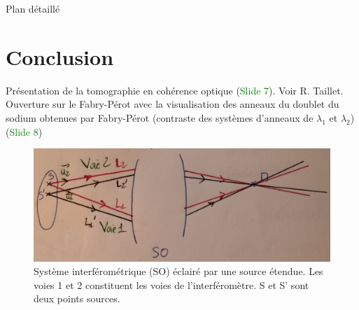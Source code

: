 \begin{reportBlock}{Plan détaillé}
  \section*{Conclusion}
  Présentation de la tomographie en cohérence optique (\textcolor{green}{Slide 7}). Voir R. Taillet.\\
  Ouverture sur le Fabry-Pérot avec la visualisation des anneaux du doublet du sodium obtenues par Fabry-Pérot (contraste des systèmes d'anneaux de $\lambda_1$ et $\lambda_2$) (\textcolor{green}{Slide 8})
\end{reportBlock}

\clearpage
  \begin{figure}[!htbp]
  \centering
  \includegraphics[scale=0.6]{LP_DivisionAmplitude/localisation.jpg}
  \caption{\label{fig:localisation}Système interférométrique (SO) éclairé par une source étendue. Les voies 1 et 2 constituent les voies de l'interféromètre. S et S' sont deux points sources.}
  \end{figure}
  

